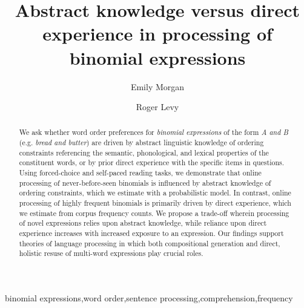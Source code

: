 \documentclass[authoryear]{elsarticle}
\begin{document}


\begin{frontmatter}
\title{Abstract knowledge versus direct experience in processing of binomial expressions}

\author[ucsd,tufts]{Emily Morgan}
\author[ucsd,mit]{Roger Levy}

\address[ucsd]{Department of Linguistics, University of California at San Diego, 9500 Gilman Drive, La Jolla, CA 92093-0108, United States}

\address[tufts]{Department of Psychology, Tufts University, 490 Boston Ave, Medford, MA 02155, United States}
\address[mit]{Department of Brain and Cognitive Sciences, Massachusetts Institute of Technology, 77 Massachusetts Avenue, Cambridge, MA 02139-4307, United States}




\begin{abstract}
We ask whether word order preferences for \emph{binomial expressions} of the form \emph{A and B} (e.g. \emph{bread and butter}) are driven by abstract linguistic knowledge of ordering constraints referencing the semantic, phonological, and lexical properties of the constituent words, or by prior direct experience with the specific items in questions. Using forced-choice and self-paced reading tasks, we demonstrate that online processing of never-before-seen binomials is influenced by abstract knowledge of ordering constraints, which we estimate with a probabilistic model. In contrast, online processing of highly frequent binomials is primarily driven by direct experience, which we estimate from corpus frequency counts. We propose a trade-off wherein processing of novel expressions relies upon abstract knowledge, while reliance upon direct experience increases with increased exposure to an expression. Our findings support theories of language processing in which both compositional generation and direct, holistic resuse of multi-word expressions play crucial roles.
\end{abstract}

\begin{keyword} binomial expressions\sep word order\sep sentence processing\sep comprehension\sep frequency \end{keyword}


\end{frontmatter}
\end{document}
